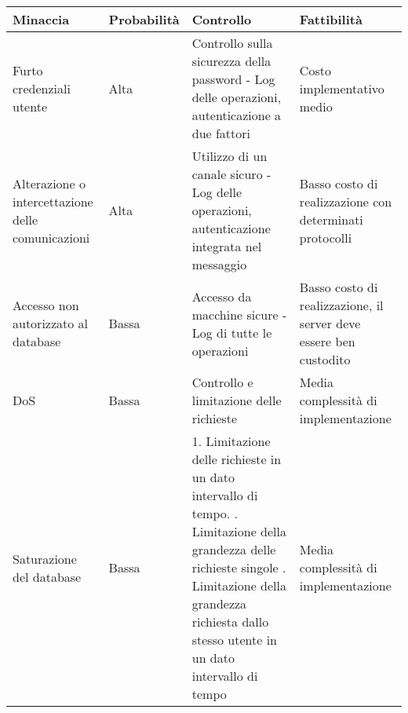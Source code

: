 \begin{tabular} {|P{3.5cm}|P{2.5cm}|P{6cm}|P{5cm}|}
  \hline
  \textbf{Minaccia}                                 & \textbf{Probabilità} & \textbf{Controllo}                                                                                                                                                                                                                      & \textbf{Fattibilità}                                              \\
  \hline
  Furto credenziali utente                          & Alta                 & Controllo sulla sicurezza della password - Log delle operazioni, autenticazione a due fattori                                                                                                                                           & Costo implementativo medio                                        \\
  \hline
  Alterazione o intercettazione delle comunicazioni & Alta                 & Utilizzo di un canale sicuro - Log delle operazioni, autenticazione integrata nel messaggio                                                                                                                                             & Basso costo di realizzazione con determinati protocolli           \\
  \hline
  Accesso non autorizzato al database               & Bassa                & Accesso da macchine sicure - Log di tutte le operazioni                                                                                                                                                                                 & Basso costo di realizzazione, il server deve essere ben custodito \\
  \hline
  DoS                                               & Bassa                & Controllo e limitazione delle richieste                                                                                                                                                                                                 & Media complessità di implementazione                              \\
  \hline
  Saturazione del database                          & Bassa                & 1. Limitazione delle richieste in un dato intervallo di tempo. . Limitazione della grandezza delle richieste singole . Limitazione della grandezza richiesta dallo stesso utente in un dato intervallo di tempo & Media complessità di implementazione                              \\
  \hline
\end{tabular}

